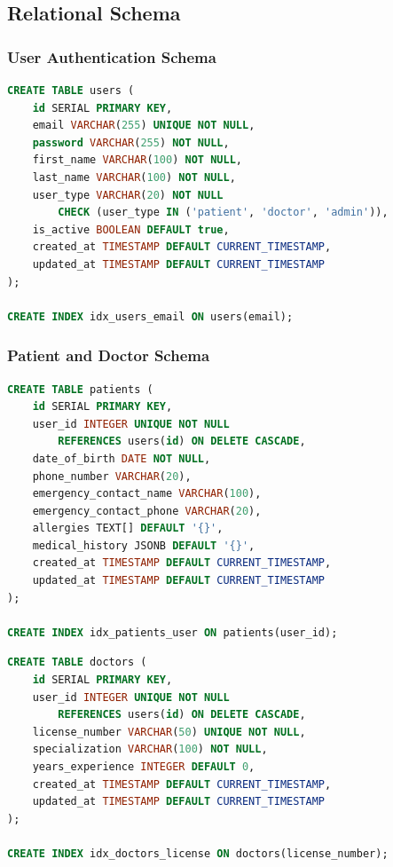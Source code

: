 \documentclass[11pt,a4paper]{article}
\begin{document}
\clearpage

\subsection{Relational Schema}

\subsubsection{User Authentication Schema}

\begin{lstlisting}[language=SQL, caption=User Table Schema]
CREATE TABLE users (
    id SERIAL PRIMARY KEY,
    email VARCHAR(255) UNIQUE NOT NULL,
    password VARCHAR(255) NOT NULL,
    first_name VARCHAR(100) NOT NULL,
    last_name VARCHAR(100) NOT NULL,
    user_type VARCHAR(20) NOT NULL 
        CHECK (user_type IN ('patient', 'doctor', 'admin')),
    is_active BOOLEAN DEFAULT true,
    created_at TIMESTAMP DEFAULT CURRENT_TIMESTAMP,
    updated_at TIMESTAMP DEFAULT CURRENT_TIMESTAMP
);

CREATE INDEX idx_users_email ON users(email);
\end{lstlisting}

\subsubsection{Patient and Doctor Schema}

\begin{lstlisting}[language=SQL, caption=Patient Table Schema]
CREATE TABLE patients (
    id SERIAL PRIMARY KEY,
    user_id INTEGER UNIQUE NOT NULL 
        REFERENCES users(id) ON DELETE CASCADE,
    date_of_birth DATE NOT NULL,
    phone_number VARCHAR(20),
    emergency_contact_name VARCHAR(100),
    emergency_contact_phone VARCHAR(20),
    allergies TEXT[] DEFAULT '{}',
    medical_history JSONB DEFAULT '{}',
    created_at TIMESTAMP DEFAULT CURRENT_TIMESTAMP,
    updated_at TIMESTAMP DEFAULT CURRENT_TIMESTAMP
);

CREATE INDEX idx_patients_user ON patients(user_id);
\end{lstlisting}

\begin{lstlisting}[language=SQL, caption=Doctor Table Schema]
CREATE TABLE doctors (
    id SERIAL PRIMARY KEY,
    user_id INTEGER UNIQUE NOT NULL 
        REFERENCES users(id) ON DELETE CASCADE,
    license_number VARCHAR(50) UNIQUE NOT NULL,
    specialization VARCHAR(100) NOT NULL,
    years_experience INTEGER DEFAULT 0,
    created_at TIMESTAMP DEFAULT CURRENT_TIMESTAMP,
    updated_at TIMESTAMP DEFAULT CURRENT_TIMESTAMP
);

CREATE INDEX idx_doctors_license ON doctors(license_number);
\end{lstlisting}
\end{document}
